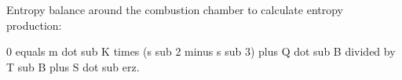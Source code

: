 Entropy balance around the combustion chamber to calculate entropy production:  

0 equals m dot sub K times (s sub 2 minus s sub 3) plus Q dot sub B divided by T sub B plus S dot sub erz.
